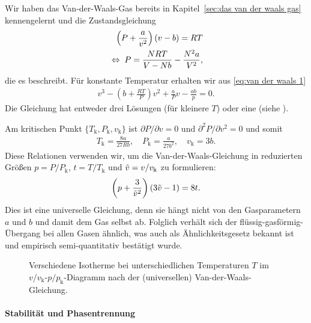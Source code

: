 Wir haben das Van-der-Waals-Gas bereits in Kapitel~\ref{sec:das van der waals gas}  kennengelernt und die Zustandsgleichung
\begin{align}
    \label{eq:van der waals 1}
    \left( P+\frac{a}{v^2}  \right) (v-b) =RT \\
    \label{eq:van der waals 2}
    \;\Leftrightarrow\; P=\frac{NRT}{V-Nb}-\frac{N^2a}{V^2},
\end{align}
die es beschreibt. Für konstante Temperatur erhalten wir aus \eqref{eq:van der waals 1}
\begin{align}
    \label{eq:van der waals isotherme}
    v^3-\left( b+\frac{RT}{P} \right)v^2+\frac{a}{P}v-\frac{ab}{p} = 0.
\end{align}
Die Gleichung hat entweder drei Lösungen (für kleinere $T$) oder eine (siehe ).

Am kritischen Punkt $\{T_\mathrm{k},P_\mathrm{k},v_\mathrm{k}\}$ ist ${\partial P}/{\partial v} = 0$ und ${\partial^2 P}/{\partial v^2}=0$ und somit
\begin{align*}
    T_\mathrm{k}=\frac{8a}{27Rb}, \quad P_\mathrm{k}=\frac{a}{27b^2},\quad v_\mathrm{k}=3b.
\end{align*}
Diese Relationen verwenden wir, um die Van-der-Waals-Gleichung in reduzierten Größen $p=P/P_\mathrm{k}$, $t=T/T_\mathrm{k}$ und $\Tilde{v}=v/v_\mathrm{k}$ zu formulieren:
\begin{align}
    \label{eq:van der waals reduziert}
    \left( p+\frac{3}{\Tilde{v}^2} \right)(3\Tilde{v}-1) = 8t.
\end{align}
Dies ist eine universelle Gleichung, denn sie hängt nicht von den Gasparametern $a$ und $b$ und damit dem Gas selbst ab. Folglich verhält sich der flüssig-gasförmig-Übergang bei allen Gasen ähnlich, was auch als Ähnlichkeitsgesetz bekannt ist und empirisch semi-quantitativ bestätigt wurde.

\begin{figure}[htbp]
    \centering
    \tfigVanDerWaalsIsotherm
    \caption{Verschiedene Isotherme bei unterschiedlichen Temperaturen $T$ im $v/v_\mathrm{k}$-$p/p_\mathrm{k}$-Diagramm nach der (universellen) Van-der-Waals-Gleichung. }
    \label{fig:VanDerWaalsIsotherm}
\end{figure}


\paragraph*{Stabilität und Phasentrennung}

